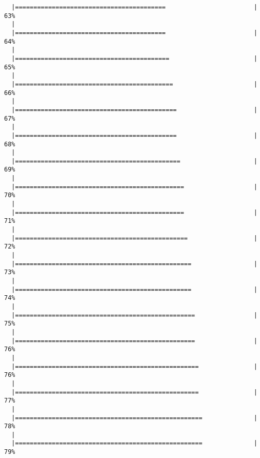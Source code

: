 \documentclass[]{article}
\begin{document}
\begin{verbatim}
  |=========================================                        |  63%
  |                                                                       
  |=========================================                        |  64%
  |                                                                       
  |==========================================                       |  65%
  |                                                                       
  |===========================================                      |  66%
  |                                                                       
  |============================================                     |  67%
  |                                                                       
  |============================================                     |  68%
  |                                                                       
  |=============================================                    |  69%
  |                                                                       
  |==============================================                   |  70%
  |                                                                       
  |==============================================                   |  71%
  |                                                                       
  |===============================================                  |  72%
  |                                                                       
  |================================================                 |  73%
  |                                                                       
  |================================================                 |  74%
  |                                                                       
  |=================================================                |  75%
  |                                                                       
  |=================================================                |  76%
  |                                                                       
  |==================================================               |  76%
  |                                                                       
  |==================================================               |  77%
  |                                                                       
  |===================================================              |  78%
  |                                                                       
  |===================================================              |  79%

\end{verbatim}
\end{document}
